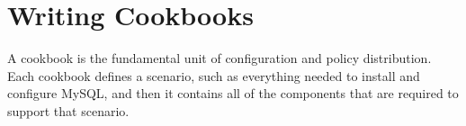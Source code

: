 \chapter{Writing Cookbooks}

A cookbook is the fundamental unit of configuration and policy distribution. Each cookbook defines a scenario, such as everything needed to install and configure MySQL, and then it contains all of the components that are required to support that scenario.








